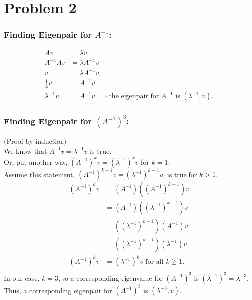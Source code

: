 \documentclass[fleqn]{article}
\begin{document}
\section*{Problem 2}
\subsubsection*{Finding Eigenpair for $A^{-1}$:}
\begin{equation*}
    \begin{split}
        Av&=\lambda v\\
        A^{-1}A v &= \lambda A^{-1} v\\
        v &= \lambda A^{-1}v\\
        \frac{1}{\lambda}v&=A^{-1}v\\
        \lambda^{-1}v&=A^{-1}v \implies \text{the eigenpair for }A^{-1}\text{ is }( \lambda^{-1},v).
    \end{split}
\end{equation*}
\subsubsection*{Finding Eigenpair for $(A^{-1})^{3}$:}
(Proof by induction)\\
\linebreak
We know that $A^{-1}v =  \lambda^{-1}v$ is true.\\
Or, put another way, $(A^{-1})^{k}v =  (\lambda^{-1})^{k}v$ for $k=1$.\\
\linebreak
Assume this statement, $(A^{-1})^{k-1}v =  (\lambda^{-1})^{k-1}v$, is true for $k>1$.\\
\begin{equation*}
    \begin{split}
        (A^{-1})^{k}v &= (A^{-1})((A^{-1})^{k-1})v\\
        &= (A^{-1})((\lambda^{-1})^{k-1})v\\
        &= ((\lambda^{-1})^{k-1})(A^{-1})v\\
        &= ((\lambda^{-1})^{k-1})(\lambda^{-1})v\\
        (A^{-1})^{k}v &= (\lambda^{-1})^{k}v \text{ for all $k\geq 1$.}\\
    \end{split}
\end{equation*}
In our case, $k=3$, so a corresponding eigenvalue for $(A^{-1})^3$ is $(\lambda^{-1})^3=\lambda^{-3}$.\\
\linebreak
Thus, a corresponding eigenpair for $(A^{-1})^3$ is $(\lambda^{-3}, v)$.
\pagebreak
\end{document}

